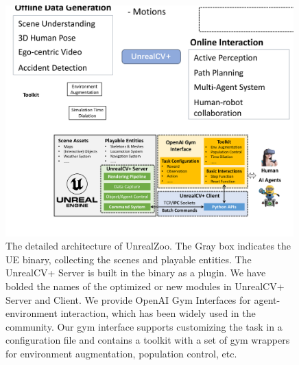 \documentclass{article}
\begin{document}
\begin{figure}[t]
    \centering
    \includegraphics[width=0.99\textwidth]{image/architecture2.pdf}
    \caption{The detailed architecture of UnrealZoo. The Gray box indicates the UE binary, collecting the scenes and playable entities. The UnrealCV+ Server is built in the binary as a plugin. We have bolded the names of the optimized or new modules in UnrealCV+ Server and Client. We provide OpenAI Gym Interfaces for agent-environment interaction, which has been widely used in the community. Our gym interface supports customizing the task in a configuration file and contains a toolkit with a set of gym wrappers for environment augmentation, population control, etc.}
    \label{fig:architecture}
\end{figure}
\end{document}
